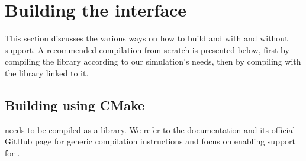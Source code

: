 \chapter{Building the interface}
\label{ch:p1:building}







This section discusses the various ways on how to build \quda and \openqxd with and without \quda support. A recommended compilation from scratch is presented below, first by compiling the \quda library according to our simulation's needs, then by compiling \openqxd with the \quda library linked to it.

\section{Building \quda using CMake}
\label{sec:building:quda}

\Quda needs to be compiled as a library. We refer to the \quda documentation \cite{QUDApaper} and its official GitHub page \cite{github:quda} for generic compilation instructions and focus on enabling support for \openqxd.

